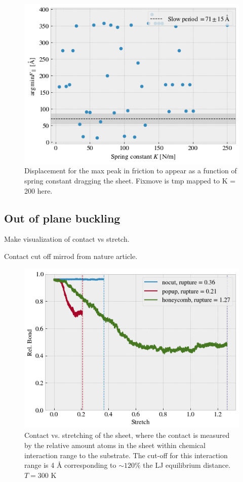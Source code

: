 \begin{figure}[H]
  \centering
  \includegraphics[width=0.6\linewidth]{figures/baseline/max_vs_K}
  \caption{Displacement for the max peak in friction to appear as a function of spring constant dragging the sheet. Fixmove is tmp mapped to K = 200 here.}
  \label{fig:max_vs_K}
\end{figure}


\newpage

\subsection{Out of plane buckling}
Make visualization of contact vs stretch.




Contact cut off mirrod from nature article.

\begin{figure}[H]
  \centering
  \includegraphics[width=0.6\linewidth]{figures/baseline/contact_vs_stretch.png}
  \caption{Contact vs. stretching of the sheet, where the contact is measured by the relative amount atoms in the sheet within chemical interaction range to the substrate. The cut-off for this interaction range is 4 Å corresponding to $\sim 120 \%$ the LJ equilibrium distance. $T = 300$ K }
  \label{fig:contact_vs_stretch}
\end{figure}



